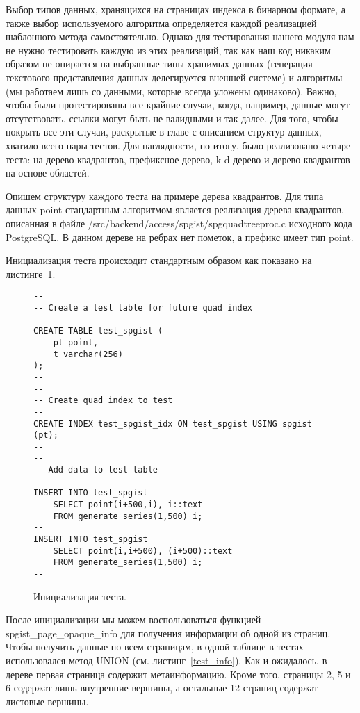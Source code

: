 \documentclass[12pt,oneside]{amsart}
\begin{document}
Выбор типов данных, хранящихся на страницах индекса в бинарном формате, а также выбор используемого алгоритма определяется каждой реализацией шаблонного метода самостоятельно. Однако для тестирования нашего модуля нам не нужно тестировать каждую из этих реализаций, так как наш код никаким образом не опирается на выбранные типы хранимых данных (генерация текстового представления данных делегируется внешней системе) и алгоритмы (мы работаем лишь со данными, которые всегда уложены одинаково). Важно, чтобы были протестированы все крайние случаи, когда, например, данные могут отсутствовать, ссылки могут быть не валидными и так далее. Для того, чтобы покрыть все эти случаи, раскрытые в главе с описанием структур данных, хватило всего пары тестов. Для наглядности, по итогу, было реализовано четыре теста: на дерево квадрантов, префиксное дерево, k-d дерево и дерево квадрантов на основе областей.

Опишем структуру каждого теста на примере дерева квадрантов. Для типа данных point стандартным алгоритмом является реализация дерева квадрантов, описанная в файле /src/backend/access/spgist/spgquadtreeproc.c исходного кода PostgreSQL. В данном дереве на ребрах нет пометок, а префикс имеет тип point.

Инициализация теста происходит стандартным образом как показано на листинге~\ref{test_init}.


\begin{figure}[ht]
\begin{lstlisting}
--
-- Create a test table for future quad index
--
CREATE TABLE test_spgist (
    pt point,
    t varchar(256)
);
--
--
-- Create quad index to test
--
CREATE INDEX test_spgist_idx ON test_spgist USING spgist (pt);
--
--
-- Add data to test table
--
INSERT INTO test_spgist
    SELECT point(i+500,i), i::text
    FROM generate_series(1,500) i;
--
INSERT INTO test_spgist
    SELECT point(i,i+500), (i+500)::text
    FROM generate_series(1,500) i;
--
\end{lstlisting}
\caption{Инициализация теста.}\label{test_init}
\end{figure}

После инициализации мы можем воспользоваться функцией spgist\_page\_opaque\_info для получения информации об одной из страниц. Чтобы получить данные по всем страницам, в одной таблице в тестах использовался метод UNION (см. листинг~\ref{test_info}). Как и ожидалось, в дереве первая страница содержит метаинформацию. Кроме того, страницы 2, 5 и 6 содержат лишь внутренние вершины, а остальные 12 страниц содержат листовые вершины.
\end{document}
